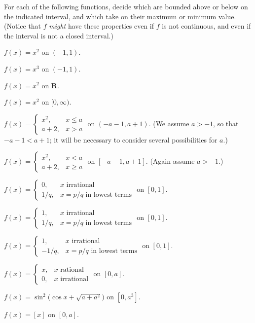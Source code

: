  For each of the following functions, decide which are bounded above
or below on the indicated interval, and which take on their maximum or minimum
value. (Notice that $f$ \emph{might} have these properties even if $f$ is not
continuous, and even if the interval is not a closed interval.)
\begin{romans}
\item $f(x)=x^2$ on $(-1,1)$.
\item $f(x)=x^3$ on $(-1,1)$.
\item $f(x)=x^2$ on $\mathbf{R}$.
\item $f(x)=x^2$ on $[0,\infty)$.
\item $\displaystyle f(x)=\begin{cases}
  x^2, & x\leq a\\
  a+2, & x>a
\end{cases}$
on $(-a-1,a+1)$. (We assume $a>-1$, so that $-a-1<a+1$; it will be necessary
to consider several possibilities for $a$.)
\item $\displaystyle f(x)=\begin{cases}
  x^2, & x<a\\
  a+2, & x\geq a
\end{cases}$
on $[-a-1,a+1]$. (Again assume $a>-1$.)
\item $\displaystyle f(x)=\begin{cases}
  0, & x\text{ irrational}\\
  1/q, & x=p/q\text{ in lowest terms}
\end{cases}$
on $[0,1]$.
\item $\displaystyle f(x)=\begin{cases}
  1, & x\text{ irrational}\\
  1/q, & x=p/q\text{ in lowest terms}
\end{cases}$
on $[0,1]$.
\item $\displaystyle f(x)=\begin{cases}
  1, & x\text{ irrational}\\
  -1/q, & x=p/q\text{ in lowest terms}
\end{cases}$
on $[0,1]$.
\item $\displaystyle f(x)=\begin{cases}
  x, & x\text{ rational}\\
  0, & x\text{ irrational}
\end{cases}$
on $[0,a]$.
\item $f(x)=\sin^2\bigl(\cos x+\sqrt{a+a^2}\bigr)$ on $[0,a^3]$.
\item $f(x)=[x]$ on $[0,a]$.
\end{romans}

